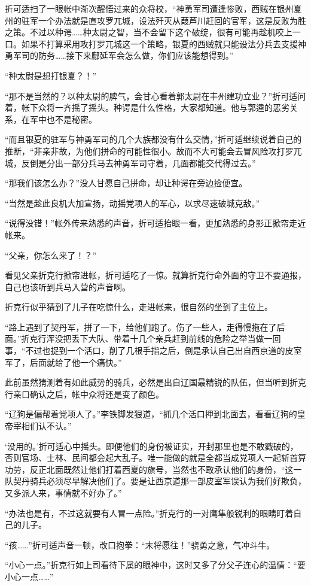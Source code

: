 折可适扫了一眼帐中渐次醒悟过来的众将校，“神勇军司遭逢惨败，西贼在银州夏州的驻军一个办法就是直攻罗兀城，设法歼灭从葭芦川赶回的官军，这是反败为胜之策。不过以种谔……种太尉之智，当不会留下这个破绽，很有可能再趁机咬上一口。如果不打算采用攻打罗兀城这一个策略，银夏的西贼就只能设法分兵去支援神勇军司的防务……接下来鄜延军会怎么做，你们应该能想得到。”

“种太尉是想打银夏？！”

“那不是当然的？以种太尉的脾气，会甘心看着郭太尉在丰州建功立业？”折可适问着，帐下众将一齐摇了摇头。种谔是什么性格，大家都知道。他与郭逵的恶劣关系，在军中也不是秘密。

“而且银夏的驻军与神勇军司的几个大族都没有什么交情，”折可适继续说着自己的推断，“非亲非故，为他们拼命的可能性很小。故而不大可能会去冒风险攻打罗兀城，反倒是分出一部分兵马去神勇军司守着，几面都能交代得过去。”

“那我们该怎么办？”没人甘愿自己拼命，却让种谔在旁边捡便宜。

“当然是趁此良机大加宣扬，动摇党项人的军心，以求尽速破城克敌。”

“说得没错！”帐外传来熟悉的声音，折可适抬眼一看，更加熟悉的身影正掀帘走近帐来。

“父亲，你怎么来了！？”

看见父亲折克行掀帘进帐，折可适吃了一惊。就算折克行命外面的守卫不要通报，自己也该听到兵马入营的声音啊。

折克行似乎猜到了儿子在吃惊什么，走进帐来，很自然的坐到了主位上。

“路上遇到了契丹军，拼了一下，给他们跑了。伤了一些人，走得慢拖在了后面。”折克行浑没把丢下大队、带着十几个亲兵赶到前线的危险之举当做一回事，“不过也捉到一个活口，削了几根手指之后，倒是承认自己出自西京道的皮室军了，后面就给了他一个痛快。”

此前虽然猜测着有如此威势的骑兵，必然是出自辽国最精锐的队伍，但当听到折克行亲口确认之后，帐中众将还是变了颜色。

“辽狗是偏帮着党项人了。”李铁脚发狠道，“抓几个活口押到北面去，看看辽狗的皇帝宰相们认不认。”

‘没用的。’折可适心中摇头。即便他们的身份被证实，开封那里也是不敢戳破的，否则官场、士林、民间都会起大乱子。唯一能做的就是全都当成党项人一起斩首算功劳，反正北面既然让他们打着西夏的旗号，当然也不敢承认他们的身份，“这一队契丹骑兵必须尽早解决他们了。要是让西京道那一部皮室军误认为我们好欺负，又多派人来，事情就不好办了。”

“办法也是有，不过这就要有人冒一点险。”折克行的一对鹰隼般锐利的眼睛盯着自己的儿子。

“孩……”折可适声音一顿，改口抱拳：“末将愿往！”骁勇之意，气冲斗牛。

“小心一点。”折克行如上司看待下属的眼神中，这时又多了分父子连心的温情：“要小心一点……”

